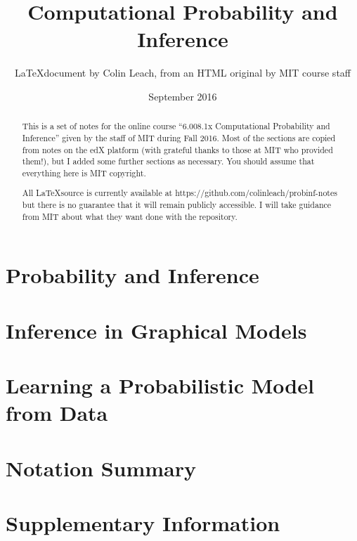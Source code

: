 



\title{Computational Probability and Inference}
\author{\LaTeX document by Colin Leach, from an HTML original by MIT course staff\\}
\date{September 2016}
\maketitle

\begin{abstract}
This is a set of notes for the online course ``6.008.1x Computational Probability and Inference'' given by the staff of MIT during Fall 2016. Most of the sections are copied from notes on the edX platform (with grateful thanks to those at MIT who provided them!), but I added some further sections as necessary. You should assume that everything here is MIT copyright.

All \LaTeX source is currently available at https://github.com/colinleach/probinf-notes but there is no guarantee that it will remain publicly accessible. I will take guidance from MIT about what they want done with the repository.
\end{abstract}

\tableofcontents

\setlength{\parindent}{0pt}
\setlength{\parskip}{0.5em}
\setlength{\intextsep}{2mm}

\chapter{Probability and Inference}












\chapter{Inference in Graphical Models}




\chapter{Learning a Probabilistic Model from Data}

\appendix
\chapter{Notation Summary}


\chapter{Supplementary Information}


